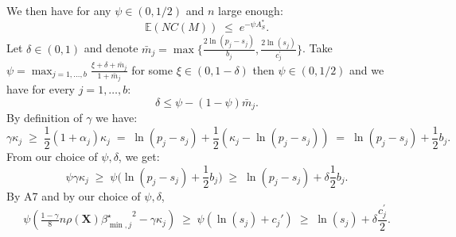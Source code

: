 \documentclass[aos]{imsart}
\theoremstyle{plain}
\newcommand{\piotr}[1]{{\small{\color{red} \sf $\clubsuit$ Piotr: #1}}}
\newcommand{\paul}[1]{{\small{\color{green} \sf $\spadesuit$ Paul: #1}}}
\newcommand{\E}{\mathbb{E}}
\newcommand{\R}{\mathbb{R}}
\newcommand{\bs}{\boldsymbol}
\begin{document}
\begin{supplement}
We then have for any $\psi \in(0,1/2)$ and $n$ large enough: 
$$
\E(NC(M))\;\leq\;e^{-\psi A_S^*}.
$$
Let $\delta \in (0,1)$ and denote $\bar{m}_j=\max\big\{\frac{2\ln(p_j-s_j)}{b_{j}},\frac{2\ln(s_j)}{c^{\prime}_{j}}\big\}$. Take $\psi=\max_{j=1,\ldots,b}\frac{\xi + \delta + \bar{m}_j}{1+\bar{m}_j}$ for some $\xi \in(0, 1- \delta)$ then $\psi \in (0,1/2)$ and we have for every $j=1,\ldots,b$:
$$\delta \leq \psi-(1-\psi)\bar{m}_j.$$ 
By definition of $\gamma$ we have: 
$$
\gamma\kappa_j\;\geq\;\frac12 (1+\alpha_j)\kappa_j\;=\;\ln(p_j-s_j)+\frac12(\kappa_j-\ln(p_j-s_j)) \;=\; \ln(p_j-s_j)+ \frac12b_{j}.
$$
From our choice of $\psi,\delta$, we get:
$$\psi\gamma\kappa_j \;\geq\; \psi\big(\ln(p_j-s_j)+ \frac12b_{j}\big) \;\geq\;  \ln(p_j-s_j)+ \delta\frac12b_{j}.$$
By A7 and by our choice of $\psi,\delta$,
$$\psi\left(\tfrac{1-\gamma}{8} n \rho(\bs X) {\beta^{\star}_{\min,j}}^{2} - \gamma\kappa_j\right) \;\geq\; \psi\left(\ln(s_j)+c_j'\right) \;\geq\; \ln(s_j)+\delta \frac{c^{\prime}_j}{2}.
$$%


\end{supplement}
\end{document}
